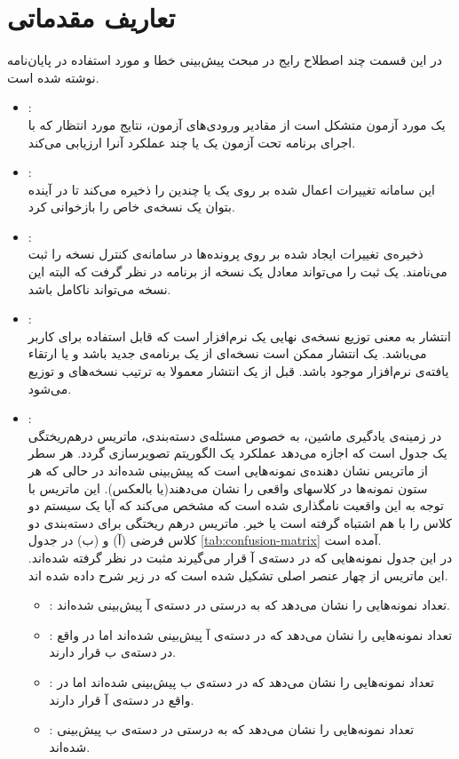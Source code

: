 \section{ تعاریف مقدماتی}
\label{sec:terms}
در این قسمت چند اصطلاح رایج در مبحث پیش‌بینی‌ خطا و مورد استفاده در پایان‌نامه نوشته شده است.
\begin{itemize}
	\item 
	: \\
	یک مورد آزمون متشکل است از مقادیر ورودی‌های آزمون، نتایج مورد انتظار که با اجرای برنامه تحت آزمون یک یا چند عملکرد آنرا ارزیابی می‌کند. 
	\item
	:\\
	این سامانه تغییرات اعمال شده بر روی یک یا چندین  را ذخیره می‌کند تا در آینده بتوان یک نسخه‌ی خاص را بازخوانی کرد. 
	\item
	:\\
	ذخیره‌ی تغییرات ایجاد شده بر روی پرونده‌ها در سامانه‌ی کنترل نسخه‌ را ثبت می‌نامند. یک ثبت را می‌تواند معادل یک نسخه از برنامه در نظر گرفت که البته این نسخه می‌تواند ناکامل باشد.
	\item
	:\\
	انتشار به معنی توزیع نسخه‌ی نهایی یک نرم‌افزار است که قابل استفاده برای کاربر می‌باشد. یک انتشار ممکن است نسخه‌ای از یک برنامه‌ی جدید باشد و یا ارتقاء یافته‌ی نرم‌افزار موجود باشد. قبل از یک انتشار معمولا به ترتیب نسخه‌های  و  توزیع می‌شود. 
	\item
	:\\
	در زمینه‌ی یادگیری ماشین، به خصوص مسئله‌ی دسته‌بندی، ماتریس درهم‌ریختگی یک جدول است که اجازه می‌دهد عملکرد یک الگوریتم تصویر‌سازی گردد. هر سطر از ماتریس نشان دهنده‌ی نمونه‌هایی است که پیش‌بینی شده‌اند در حالی که هر ستون نمونه‌ها در کلاسهای واقعی را نشان می‌دهند(یا بالعکس). این ماتریس با توجه به این واقعیت نامگذاری شده است که  مشخص می‌کند که آیا یک سیستم دو کلاس را با هم اشتباه گرفته است یا خیر. ماتریس درهم ریختگی برای دسته‌بندی دو کلاس فرضی (آ) و (ب) در جدول \ref{tab:confusion-matrix} آمده است. \\
	در این جدول نمونه‌هایی که در دسته‌ی آ قرار می‌گیرند مثبت در نظر گرفته شده‌اند. این ماتریس از چهار عنصر اصلی تشکیل شده است که در زیر شرح داده شده اند. 
	\begin{itemize}
		\item 
		: تعداد نمونه‌هایی را نشان می‌دهد که به درستی در دسته‌ی آ پیش‌بینی شده‌اند.
		\item
		: تعداد نمونه‌هایی را نشان می‌دهد که در دسته‌ی آ پیش‌بینی شده‌اند اما در واقع در دسته‌ی ب قرار دارند.
		\item
		: تعداد نمونه‌هایی را نشان می‌دهد که در دسته‌ی ب پیش‌بینی شده‌اند اما در واقع در دسته‌ی آ قرار دارند.
		\item
		: تعداد نمونه‌هایی را نشان می‌دهد که به درستی در دسته‌ی ب پیش‌بینی شده‌اند.
	\end{itemize}
	
\end{itemize}	

